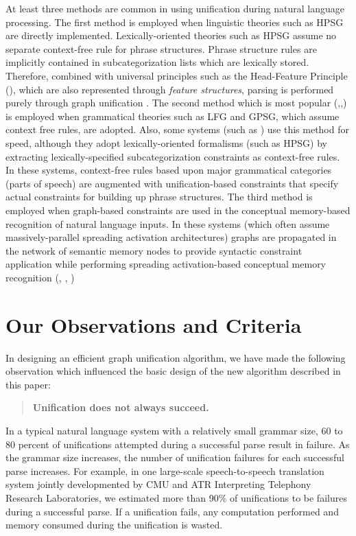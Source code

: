 At least three methods are common in using unification during natural
language processing. The first method is employed when linguistic theories such
as HPSG are directly implemented.  Lexically-oriented theories such as
HPSG assume no separate context-free rule for phrase structures.
Phrase structure rules are implicitly contained in subcategorization
lists which are lexically stored. Therefore, combined with universal
principles such as the Head-Feature Principle (\cite{HPSG}), which are also
represented through {\it feature structures}, parsing is 
performed purely through graph unification \cite{Alex}.  The second method
which is most popular (\cite{PATR-II},\cite{UP},\cite{SL-TRANS}) is employed
when grammatical theories such as LFG and GPSG, which assume
context free rules, are adopted. Also, some systems (such as
\cite{SL-TRANS}) use this method for speed, although they adopt
lexically-oriented formalisms (such as HPSG) by extracting lexically-specified 
subcategorization constraints as context-free rules. In
these systems, context-free rules based upon major grammatical
categories (parts of speech) are augmented with unification-based
constraints that specify actual constraints for building up phrase
structures. The third method is employed when graph-based constraints are used
in the conceptual memory-based recognition of natural language inputs.
In these systems (which often assume massively-parallel spreading
activation architectures) graphs are propagated in the network of
semantic memory nodes to provide syntactic constraint application
while performing spreading activation-based conceptual memory
recognition (\cite{HMCP}, \cite{cogsci91}, \cite{MONA-LISA})


\section{Our Observations and Criteria}

In designing an efficient graph unification algorithm, we
have made the following observation which influenced the basic
design of the new algorithm described in this paper:

\begin{quote}
{\bf Unification does not always succeed.} 
\end{quote}

In a typical natural language system with a relatively small grammar
size, 60 to 80 percent of unifications attempted during a successful
parse result in failure.  As the grammar size increases, the number of
unification failures for each successful parse increases.  For
example, in one large-scale speech-to-speech translation system
jointly developmented by CMU and ATR Interpreting Telephony
Research Laboratories, we estimated more than 90\% of unifications to be
failures during a successful parse.  If a unification fails, any
computation performed and memory consumed during the unification is
wasted.

